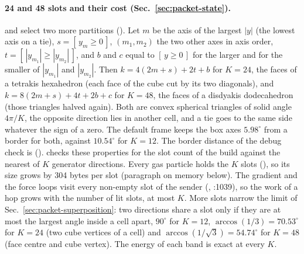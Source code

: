 \paragraph{24 and 48 slots and their cost (Sec.~\ref{sec:packet-state}).}
 and  select two more partitions
(). Let $m$ be the axis of the largest $|y|$
(the lowest axis on a tie), $s=[\,y_m\ge0\,]$, $(m_1,m_2)$ the two other axes
in axis order, $t=[\,|y_{m_1}|\ge|y_{m_2}|\,]$, and $b$ and $c$ equal to
$[\,y\ge0\,]$ for the larger and for the smaller of $|y_{m_1}|$ and
$|y_{m_2}|$. Then $k=4(2m+s)+2t+b$ for $K=24$, the faces of a tetrakis
hexahedron (each face of the cube cut by its two diagonals), and
$k=8(2m+s)+4t+2b+c$ for $K=48$, the faces of a disdyakis dodecahedron (those
triangles halved again). Both are convex spherical triangles of solid angle
$4\pi/K$, the opposite direction lies in another cell, and a tie goes to the
same side whatever the sign of a zero. The default frame keeps the box axes
$5.98^\circ$ from a border for both, against $10.54^\circ$ for $K=12$. The
border distance of the debug check is
 ().
 checks these properties for the
slot count of the build against the nearest of $K$ generator directions.
Every gas particle holds the $K$ slots (), so
its size grows by 304 bytes per slot (paragraph on memory below). The gradient and the force loops visit
every non-empty slot of the sender (, :1039), so
the work of a hop grows with the number of lit slots, at most $K$. More slots
narrow the limit of Sec.~\ref{sec:packet-superposition}: two directions share a
slot only if they are at most the largest angle inside a cell apart, $90^\circ$
for $K=12$, $\arccos(1/3)=70.53^\circ$ for $K=24$ (two cube vertices of a cell)
and $\arccos(1/\sqrt3)=54.74^\circ$ for $K=48$ (face centre and cube vertex).
The energy of each band is exact at every $K$.

